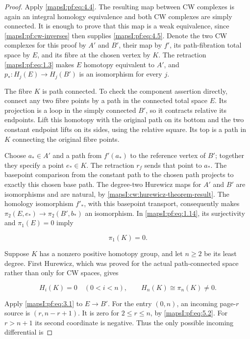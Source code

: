 \documentclass[11pt]{article}
\begin{document}
\begin{proof}
Apply \eqref{mapsI:pf:eq:4.4}. The resulting map between CW complexes is again an integral homology equivalence and both CW complexes are simply connected. It is enough to prove that this map is a weak equivalence, since \cref{mapsI:pf:cw-inverses} then supplies \eqref{mapsI:pf:eq:4.5}. Denote the two CW complexes for this proof by \(A'\) and \(B'\), their map by \(f'\), its path-fibration total space by \(E\), and its fibre at the chosen vertex by \(K\). The retraction \eqref{mapsI:pf:eq:1.3} makes \(E\) homotopy equivalent to \(A'\), and \(p_*:H_j(E)\to H_j(B')\) is an isomorphism for every \(j\).

The fibre \(K\) is path connected. To check the component assertion directly, connect any two fibre points by a path in the connected total space \(E\). Its projection is a loop in the simply connected \(B'\), so it contracts relative its endpoints. Lift this homotopy with the original path on its bottom and the two constant endpoint lifts on its sides, using the relative square. Its top is a path in \(K\) connecting the original fibre points.

Choose \(a_*\in A'\) and a path from \(f'(a_*)\) to the reference vertex of \(B'\); together they specify a point \(e_*\in K\). The retraction \(r_f\) sends that point to \(a_*\). The basepoint comparison from the constant path to the chosen path projects to exactly this chosen base path. The degree-two Hurewicz maps for \(A'\) and \(B'\) are isomorphisms and are natural, by \cref{mapsI:cw:hurewicz-theorem-result}. The homology isomorphism \(f'_*\), with this basepoint transport, consequently makes \(\pi_2(E,e_*)\to\pi_2(B',b_*)\) an isomorphism. In \eqref{mapsI:pf:eq:1.14}, its surjectivity and \(\pi_1(E)=0\) imply

\begin{equation}
\pi_1(K)=0.
\label{mapsI:pf:eq:5.1}
\end{equation}

Suppose \(K\) has a nonzero positive homotopy group, and let \(n\geq2\) be its least degree. First Hurewicz, which was proved for the actual path-connected space rather than only for CW spaces, gives

\begin{equation}
H_i(K)=0\quad(0<i<n),\qquad
H_n(K)\cong\pi_n(K)\ne0.
\label{mapsI:pf:eq:5.2}
\end{equation}

Apply \eqref{mapsI:pf:eq:3.1} to \(E\to B'\). For the entry \((0,n)\), an incoming page-\(r\) source is \((r,n-r+1)\). It is zero for \(2\leq r\leq n\), by \eqref{mapsI:pf:eq:5.2}. For \(r>n+1\) its second coordinate is negative. Thus the only possible incoming differential is


\end{proof}
\end{document}
